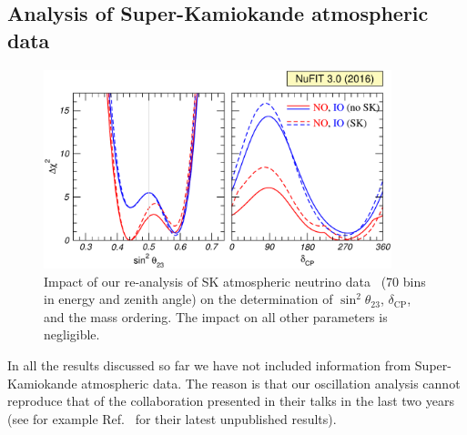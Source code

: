 \documentclass[a4paper, 11pt]{article}
\begin{document}
\subsection{Analysis of Super-Kamiokande atmospheric data}
\label{subsec:SK}

\begin{figure}\centering
  \includegraphics[width=0.9\textwidth]{fig-chisq-atmos}
  \caption{Impact of our re-analysis of SK atmospheric neutrino
    data~\cite{Wendell:2014dka} (70 bins in energy and zenith angle)
    on the determination of $\sin^2\theta_{23}$, $\delta_\text{CP}$,
    and the mass ordering. The impact on all other parameters is
    negligible.}
  \label{fig:chisq-atmos}
\end{figure}

In all the results discussed so far we have not included information
from Super-Kamiokande atmospheric data. The reason is that our
oscillation analysis cannot reproduce that of the collaboration
presented in their talks in the last two years (see for example
Ref.~\cite{skatm:nufact2016} for their latest unpublished results).
\end{document}
